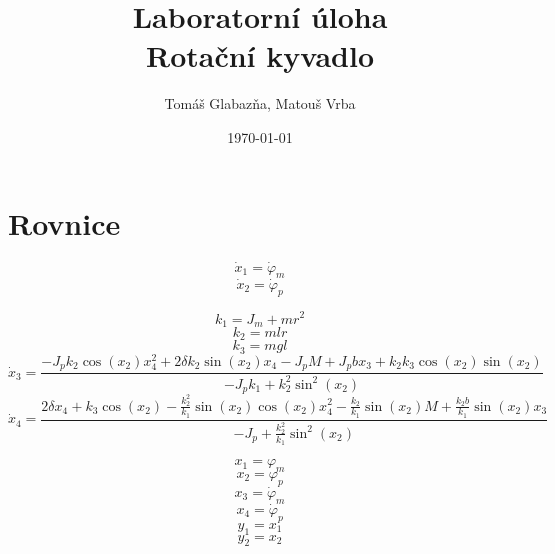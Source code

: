 \documentclass[11pt,a4paper]{article}
\title{%
  Laboratorní úloha \\
  \large Rotační kyvadlo}
\author{Tomáš Glabazňa, Matouš Vrba}
\date{\today}
\begin{document}
\maketitle


\section*{Rovnice}
\newcommand{\x}[1]{x_{#1}}
\newcommand{\xd}[1]{\dot{x}_{#1}}
\newcommand{\M}{M}
\newcommand{\phid}[1]{\dot{\varphi}_{#1}}
\newcommand{\phin}[1]{\varphi_{#1}} %
\newcommand{\coss}[1]{\cos{(#1)}}
\newcommand{\sinn}[1]{\sin{(#1)}}
\newcommand{\sinnN}[1]{\sin^2{(#1)}} %

$$
\xd{1} = \phid{m}
$$
$$
\xd{2} = \phid{p}
$$

$$
k_1 = J_m + m r^2
$$
$$
k_2 = m l r
$$
$$
k_3 = m g l
$$
$$
\xd{3} =
\frac{
	-J_p k_2 \coss{\x{2}} \x{4}^2 + 2 \delta k_2 \sinn{\x{2}} \x{4} - J_p \M + J_p b \x{3} 	+ k_2 k_3 \coss{\x{2}} \sinn{\x{2}}
}{
 	-J_p k_1 + k_2^2 \sinnN{\x{2}}
}
$$
$$
\xd{4} =
\frac{
	2 \delta \x{4} + k_3 \coss{\x{2}} - \frac{k_2^2}{k_1} \sinn{\x{2}} \coss{\x{2}} 			 	\x{4}^2 - \frac{k_2}{k_1} \sinn{\x{2}} M + \frac{k_2 b}{k_1} \sinn{\x{2}} \x{3}
}{
	-J_p + \frac{k_2^2}{k_1} \sinnN{\x{2}}
}
$$

$$
x_1 = \phin{m}
$$
$$
x_2 = \phin{p}
$$
$$
x_3 = \phid{m}
$$
$$
x_4 = \phid{p}
$$
$$
y_1 = x_1
$$
$$
y_2 = x_2
$$
\end{document}
